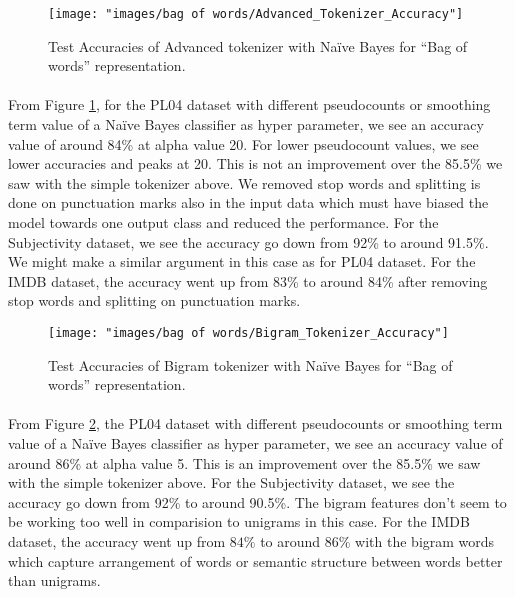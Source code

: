 \documentclass[a4paper,26pt]{article}
\begin{document}
\begin{figure}[H]
\centerline{\texttt{[image: "images/bag of words/Advanced\_Tokenizer\_Accuracy"]}}
\caption{Test Accuracies of Advanced tokenizer with Na\"{i}ve Bayes for ``Bag of words'' representation.}
\label{fig:advancedtok}
\end{figure}

\paragraph{}
From Figure \ref{fig:advancedtok}, for the PL04 dataset with different pseudocounts or smoothing term value of a Na\"{i}ve Bayes classifier as hyper parameter, we see an accuracy value of around 84\% at alpha value 20. For lower pseudocount values, we see lower accuracies and peaks at 20. This is not an improvement over the 85.5\% we saw with the simple tokenizer above. We removed stop words and splitting is done on punctuation marks also in the input data which must have biased the model towards one output class and reduced the performance. For the Subjectivity dataset, we see the accuracy go down from  92\% to around 91.5\%. We might make a similar argument in this case as for PL04 dataset. For the IMDB dataset, the accuracy went up from 83\% to around 84\% after removing stop words and splitting on punctuation marks. 

\begin{figure}[H]
\centerline{\texttt{[image: "images/bag of words/Bigram\_Tokenizer\_Accuracy"]}}
\caption{Test Accuracies of Bigram tokenizer with Na\"{i}ve Bayes for ``Bag of words'' representation.}
\label{fig:bigramtok}
\end{figure}

\paragraph{}
From Figure \ref{fig:bigramtok}, the PL04 dataset with different pseudocounts or smoothing term value of a Na\"{i}ve Bayes classifier as hyper parameter, we see an accuracy value of around 86\% at alpha value 5. This is an improvement over the 85.5\% we saw with the simple tokenizer above. For the Subjectivity dataset, we see the accuracy go down from  92\% to around 90.5\%. The bigram features don't seem to be working too well in comparision to unigrams in this case. For the IMDB dataset, the accuracy went up from $84\%$ to around $86\%$ with the bigram words which capture arrangement of words or semantic structure between words better than unigrams.
\end{document}
